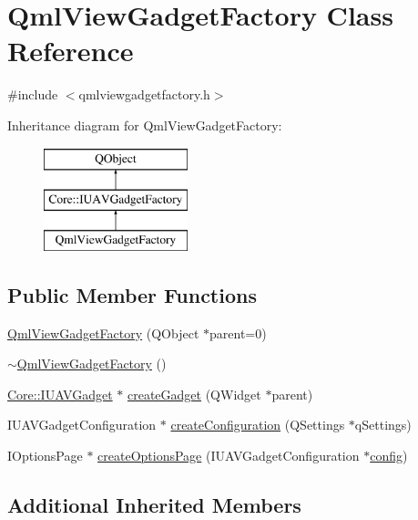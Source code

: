 \hypertarget{class_qml_view_gadget_factory}{\section{Qml\-View\-Gadget\-Factory Class Reference}
\label{class_qml_view_gadget_factory}
}


{\ttfamily \#include $<$qmlviewgadgetfactory.\-h$>$}

Inheritance diagram for Qml\-View\-Gadget\-Factory\-:\begin{figure}[H]
\begin{center}
\leavevmode
\includegraphics[height=3.000000cm]{class_qml_view_gadget_factory}
\end{center}
\end{figure}
\subsection*{Public Member Functions}
\begin{DoxyCompactItemize}
\item 
\hyperlink{group___o_p_map_plugin_ga84b7aa224d691ff4283bf3201a8f3b5e}{Qml\-View\-Gadget\-Factory} (Q\-Object $\ast$parent=0)
\item 
\hyperlink{group___o_p_map_plugin_ga2ae87f4b2a912a2e38fe69c6b8b3e3e7}{$\sim$\-Qml\-View\-Gadget\-Factory} ()
\item 
\hyperlink{class_core_1_1_i_u_a_v_gadget}{Core\-::\-I\-U\-A\-V\-Gadget} $\ast$ \hyperlink{group___o_p_map_plugin_gadceaaa6e9f968a951f33f6c1a7de1340}{create\-Gadget} (Q\-Widget $\ast$parent)
\item 
I\-U\-A\-V\-Gadget\-Configuration $\ast$ \hyperlink{group___o_p_map_plugin_ga9000c14dd19e5dbc8e5c8e2ed26b2553}{create\-Configuration} (Q\-Settings $\ast$q\-Settings)
\item 
I\-Options\-Page $\ast$ \hyperlink{group___o_p_map_plugin_gab0af6f5774c846fe82b1b073cf0bbb76}{create\-Options\-Page} (I\-U\-A\-V\-Gadget\-Configuration $\ast$\hyperlink{deflate_8c_a4473b5227787415097004fd39f55185e}{config})
\end{DoxyCompactItemize}
\subsection*{Additional Inherited Members}



